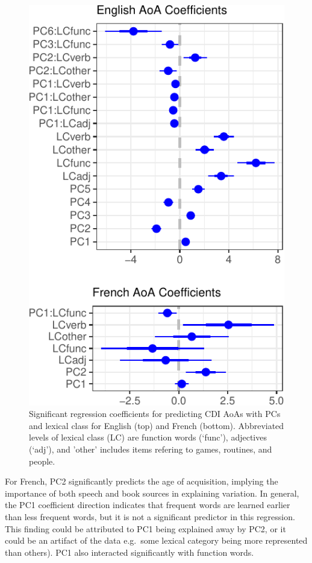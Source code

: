\documentclass[10pt, letterpaper]{article}
\newenvironment{CodeChunk}{}{}
\begin{document}
\begin{CodeChunk}
\begin{figure}[H]

{\centering \includegraphics{figs/unnamed-chunk-9-1} 

}

\caption[Significant regression coefficients for predicting CDI AoAs with PCs and lexical class for English (top) and French (bottom)]{Significant regression coefficients for predicting CDI AoAs with PCs and lexical class for English (top) and French (bottom). Abbreviated levels of lexical class (LC) are function words (`func'), adjectives (`adj'), and 'other' includes items refering to games, routines, and people.}\label{fig:unnamed-chunk-9}
\end{figure}
\end{CodeChunk}

For French, PC2 significantly predicts the age of acquisition, implying
the importance of both speech and book sources in explaining variation.
In general, the PC1 coefficient direction indicates that frequent words
are learned earlier than less frequent words, but it is not a
significant predictor in this regression. This finding could be
attributed to PC1 being explained away by PC2, or it could be an
artifact of the data e.g.~some lexical category being more represented
than others). PC1 also interacted significantly with function words.
\end{document}
